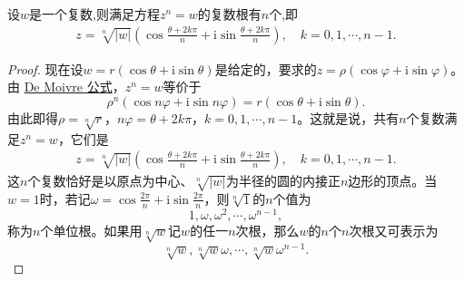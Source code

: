 \documentclass[../../main.tex]{subfiles}
\begin{document}
\begin{proposition}
设$w$是一个复数,则满足方程$z^n=w$的复数根有$n$个,即
\begin{align*}
z = \sqrt[n]{|w|}\left( \cos\frac{\theta + 2k\pi}{n} + \mathrm{i}\sin\frac{\theta + 2k\pi}{n} \right),\quad k = 0, 1, \cdots, n - 1.
\end{align*}
\end{proposition}
\begin{proof}
现在设\(w = r(\cos\theta + \mathrm{i}\sin\theta)\)是给定的，要求的\(z = \rho(\cos\varphi + \mathrm{i}\sin\varphi)\)。由 \hyperref[theorem:De Moivre公式]{De Moivre 公式}，\(z^n = w\)等价于
\[
\rho^n(\cos n\varphi + \mathrm{i}\sin n\varphi) = r(\cos\theta + \mathrm{i}\sin\theta).
\]
由此即得\(\rho = \sqrt[n]{r}\)，\(n\varphi = \theta + 2k\pi\)，\(k = 0, 1, \cdots, n - 1\)。这就是说，共有\(n\)个复数满足\(z^n = w\)，它们是
\[
\begin{split}
z = \sqrt[n]{|w|}\left( \cos\frac{\theta + 2k\pi}{n} + \mathrm{i}\sin\frac{\theta + 2k\pi}{n} \right),\quad k = 0, 1, \cdots, n - 1.
\end{split}
\]
这\(n\)个复数恰好是以原点为中心、\(\sqrt[n]{|w|}\)为半径的圆的内接正\(n\)边形的顶点。当\(w = 1\)时，若记\(\omega = \cos\frac{2\pi}{n} + \mathrm{i}\sin\frac{2\pi}{n}\)，则\(\sqrt[n]{1}\)的\(n\)个值为
\[
1, \omega, \omega^2, \cdots, \omega^{n - 1},
\]
称为\(n\)个单位根。如果用\(\sqrt[n]{w}\)记\(w\)的任一\(n\)次根，那么\(w\)的\(n\)个\(n\)次根又可表示为
\[
\sqrt[n]{w}, \sqrt[n]{w}\omega, \cdots, \sqrt[n]{w}\omega^{n - 1}.
\]

\end{proof}
\end{document}
